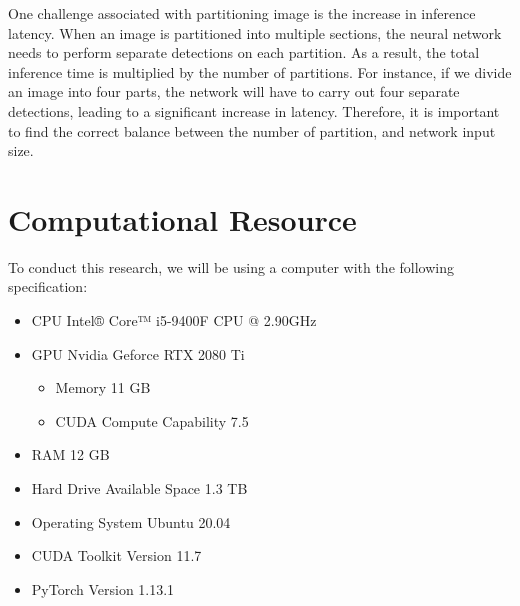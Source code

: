   One challenge associated with partitioning image is the increase in inference latency.
  When an image is partitioned into multiple sections, the neural network needs to perform separate detections on each partition.
  As a result, the total inference time is multiplied by the number of partitions.
  For instance, if we divide an image into four parts, the network will have to carry out four separate detections, leading to a significant increase in latency. 
  Therefore, it is important to find the correct balance between the number of partition, and network input size.
    
\section{Computational Resource}
\label{section:instrument}
To conduct this research, we will be using a computer with the following specification:
\begin{itemize}[itemsep=1pt,leftmargin=.1\textwidth,rightmargin=.1\textwidth]
  \item CPU \hfill Intel® Core™ i5-9400F CPU @ 2.90GHz
  \item GPU \hfill Nvidia Geforce RTX 2080 Ti
  \begin{itemize}[noitemsep,topsep=0pt]
    \item[] Memory \hfill 11 GB
    \item[] CUDA Compute Capability \hfill 7.5
  \end{itemize}
  \item RAM \hfill 12 GB
  \item Hard Drive Available Space \hfill 1.3 TB
  \item Operating System \hfill Ubuntu 20.04
  \item CUDA Toolkit Version \hfill 11.7
  \item PyTorch Version \hfill 1.13.1
\end{itemize}

